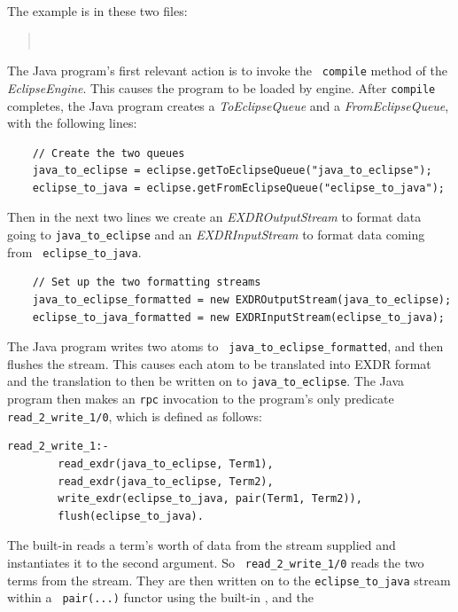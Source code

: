 The example is in these two files: 
\begin{quote}
\\
\end{quote}
The Java program's first relevant action is to invoke the {\tt
compile} method of the {\it EclipseEngine}. This causes the {\eclipse}
program to be loaded by {\eclipse} engine. After {\tt compile}
completes, the Java program creates a {\it ToEclipseQueue} and a {\it
FromEclipseQueue}, with the following lines:
\begin{verbatim}
    // Create the two queues
    java_to_eclipse = eclipse.getToEclipseQueue("java_to_eclipse");
    eclipse_to_java = eclipse.getFromEclipseQueue("eclipse_to_java");
\end{verbatim}
Then in the next two lines we create an {\it EXDROutputStream} to
format data going to {\tt java\_to\_eclipse} and an {\it
EXDRInputStream} to format data coming from {\tt
eclipse\_to\_java}.
\begin{verbatim}
    // Set up the two formatting streams
    java_to_eclipse_formatted = new EXDROutputStream(java_to_eclipse);
    eclipse_to_java_formatted = new EXDRInputStream(eclipse_to_java);
\end{verbatim}
The Java program writes two atoms to {\tt
java\_to\_eclipse\_formatted}, and then flushes the stream. This
causes each atom to be translated into EXDR format and the translation
to then be written on to {\tt java_to_eclipse}. The Java program then
makes an {\tt rpc} invocation to the {\eclipse} program's only predicate
{\tt read_2_write_1/0}, which is defined as follows:
\begin{verbatim}
read_2_write_1:-
        read_exdr(java_to_eclipse, Term1),
        read_exdr(java_to_eclipse, Term2),
        write_exdr(eclipse_to_java, pair(Term1, Term2)),
        flush(eclipse_to_java).
\end{verbatim}
The built-in  reads a term's worth of data from the
stream supplied and instantiates it to the second argument. So {\tt
read\_2\_write\_1/0} reads the two terms from the stream. They are
then written on to the {\tt eclipse\_to\_java} stream within a {\tt
pair(...)} functor using the built-in , and the
